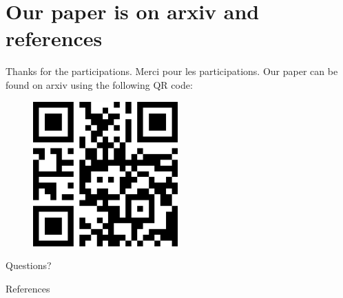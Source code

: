 \documentclass[11pt]{beamer}
\theoremstyle{definition}
\begin{document}
\section{Our paper is on arxiv and references}
    \begin{frame}{Thanks for the participations. Merci pour les participations.}
        Our paper can be found on arxiv using the following QR code: 
        \begin{figure}
            \centering
            \includegraphics[width=15em]{assets/paper-qrcode.png}
        \end{figure}
        Questions?
    \end{frame}
    \begin{frame}{References}        
        
    \end{frame}
\end{document}
